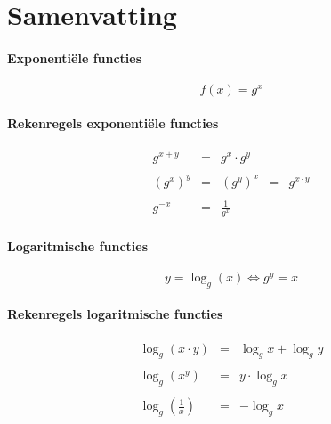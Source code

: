 
\section{Samenvatting}
\paragraph{Exponenti\"ele functies}
\[
  f(x) = g^x
\]
\paragraph{Rekenregels exponenti\"ele functies}
\[
  \begin{array}{rclcl}
    g^{x+y}  & = & g^x \cdot g^y                     \\ \\
    \displaystyle (g^x)^y & = & \displaystyle (g^y)^x           & = & g^{x \cdot y} \\ \\
    \displaystyle g^{-x}   & = & \displaystyle \frac{1}{g^x}
  \end{array}
\]
\paragraph{Logaritmische functies}
\[
  y = \log_g(x) \iff g^y = x
\]
\paragraph{Rekenregels logaritmische functies}
\[
  \begin{array}{rcl}
    \log_g(x \cdot y) & = & \log_g x + \log_g y \\ \\
    \log_g(x^y) & = & y \cdot \log_g x \\ \\
    \displaystyle \log_g(\frac1x) & = & -\log_g x
  \end{array}
\]




